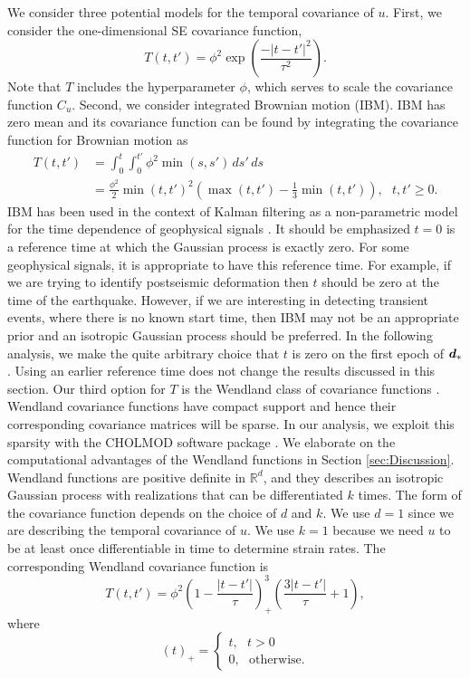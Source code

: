 \documentclass[extra,mreferee]{gji}
\begin{document}
We consider three potential models for the temporal covariance of $u$. First, we consider the one-dimensional SE covariance function, 
\begin{equation}\label{eq:TimeSE}
T(t,t') = \phi^2\exp\left(\frac{-|t - t'|^2}{\tau^2}\right).
\end{equation}
Note that $T$ includes the hyperparameter $\phi$, which serves to scale the covariance function $C_u$. Second, we consider integrated Brownian motion (IBM). IBM has zero mean and its covariance function can be found by integrating the covariance function for Brownian motion as
\begin{align}\label{eq:IBM}
T(t,t') &= \int_0^t \int_0^{t'} \phi^2 \min(s,s') \,ds'\,ds \\
        &= \frac{\phi^2}{2}\min(t,t')^2 \left(\max(t,t') - \frac{1}{3}\min(t,t')\right), \ \ \ t,t' \geq 0.
\end{align}
IBM has been used in the context of Kalman filtering as a non-parametric model for the time dependence of geophysical signals \citep[e.g.,][]{Segall1997,McGuire2003,Ohtani2010,Hines2016a}. It should be emphasized $t=0$ is a reference time at which the Gaussian process is exactly zero. For some geophysical signals, it is appropriate to have this reference time. For example, if we are trying to identify postseismic deformation then $t$ should be zero at the time of the earthquake.  However, if we are interesting in detecting transient events, where there is no known start time, then IBM may not be an appropriate prior and an isotropic Gaussian process should be preferred. In the following analysis, we make the quite arbitrary choice that $t$ is zero on the first epoch of $\mitbf{d}_*$. Using an earlier reference time does not change the results discussed in this section. Our third option for $T$ is the Wendland class of covariance functions \citep{Wendland2005}. Wendland covariance functions have compact support and hence their corresponding covariance matrices will be sparse. In our analysis, we exploit this sparsity with the CHOLMOD software package \citep{Chen2008}. We elaborate on the computational advantages of the Wendland functions in Section \ref{sec:Discussion}. Wendland functions are positive definite in $\mathbb{R}^d$, and they describes an isotropic Gaussian process with realizations that can be differentiated $k$ times. The form of the covariance function depends on the choice of $d$ and $k$. We use $d=1$ since we are describing the temporal covariance of $u$. We use $k=1$ because we need $u$ to be at least once differentiable in time to determine strain rates. The corresponding Wendland covariance function is 
\begin{equation}\label{eq:Wendland}
T(t,t') = \phi^2\left(1 - \frac{|t - t'|}{\tau}\right)^3_+ \left(\frac{3|t - t'|}{\tau} + 1\right), 
\end{equation}
where
\begin{equation}
(t)_+ = 
\begin{cases}
t, \ \ \ t > 0 \\
0, \ \ \ \mathrm{otherwise}.
\end{cases}
\end{equation}
\end{document}
